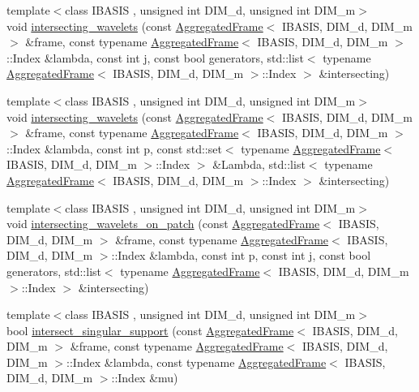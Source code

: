\begin{CompactItemize}
\item 
{\footnotesize template$<$class IBASIS , unsigned int DIM\_\-d, unsigned int DIM\_\-m$>$ }\\void \hyperlink{namespaceFrameTL_1823fb7effb657b388e652efbef319b3}{intersecting\_\-wavelets} (const \hyperlink{classFrameTL_1_1AggregatedFrame}{AggregatedFrame}$<$ IBASIS, DIM\_\-d, DIM\_\-m $>$ \&frame, const typename \hyperlink{classFrameTL_1_1AggregatedFrame}{AggregatedFrame}$<$ IBASIS, DIM\_\-d, DIM\_\-m $>$::Index \&lambda, const int j, const bool generators, std::list$<$ typename \hyperlink{classFrameTL_1_1AggregatedFrame}{AggregatedFrame}$<$ IBASIS, DIM\_\-d, DIM\_\-m $>$::Index $>$ \&intersecting)
\item 
{\footnotesize template$<$class IBASIS , unsigned int DIM\_\-d, unsigned int DIM\_\-m$>$ }\\void \hyperlink{namespaceFrameTL_0005c53dfff8661290582ea77b5ebcff}{intersecting\_\-wavelets} (const \hyperlink{classFrameTL_1_1AggregatedFrame}{AggregatedFrame}$<$ IBASIS, DIM\_\-d, DIM\_\-m $>$ \&frame, const typename \hyperlink{classFrameTL_1_1AggregatedFrame}{AggregatedFrame}$<$ IBASIS, DIM\_\-d, DIM\_\-m $>$::Index \&lambda, const int p, const std::set$<$ typename \hyperlink{classFrameTL_1_1AggregatedFrame}{AggregatedFrame}$<$ IBASIS, DIM\_\-d, DIM\_\-m $>$::Index $>$ \&Lambda, std::list$<$ typename \hyperlink{classFrameTL_1_1AggregatedFrame}{AggregatedFrame}$<$ IBASIS, DIM\_\-d, DIM\_\-m $>$::Index $>$ \&intersecting)
\item 
{\footnotesize template$<$class IBASIS , unsigned int DIM\_\-d, unsigned int DIM\_\-m$>$ }\\void \hyperlink{namespaceFrameTL_e57f8b33a1d5167ca7a23c7762e9ad1a}{intersecting\_\-wavelets\_\-on\_\-patch} (const \hyperlink{classFrameTL_1_1AggregatedFrame}{AggregatedFrame}$<$ IBASIS, DIM\_\-d, DIM\_\-m $>$ \&frame, const typename \hyperlink{classFrameTL_1_1AggregatedFrame}{AggregatedFrame}$<$ IBASIS, DIM\_\-d, DIM\_\-m $>$::Index \&lambda, const int p, const int j, const bool generators, std::list$<$ typename \hyperlink{classFrameTL_1_1AggregatedFrame}{AggregatedFrame}$<$ IBASIS, DIM\_\-d, DIM\_\-m $>$::Index $>$ \&intersecting)
\item 
{\footnotesize template$<$class IBASIS , unsigned int DIM\_\-d, unsigned int DIM\_\-m$>$ }\\bool \hyperlink{namespaceFrameTL_27f6cca23b933ff76a0597a62f5dd870}{intersect\_\-singular\_\-support} (const \hyperlink{classFrameTL_1_1AggregatedFrame}{AggregatedFrame}$<$ IBASIS, DIM\_\-d, DIM\_\-m $>$ \&frame, const typename \hyperlink{classFrameTL_1_1AggregatedFrame}{AggregatedFrame}$<$ IBASIS, DIM\_\-d, DIM\_\-m $>$::Index \&lambda, const typename \hyperlink{classFrameTL_1_1AggregatedFrame}{AggregatedFrame}$<$ IBASIS, DIM\_\-d, DIM\_\-m $>$::Index \&mu)

\end{CompactItemize}

